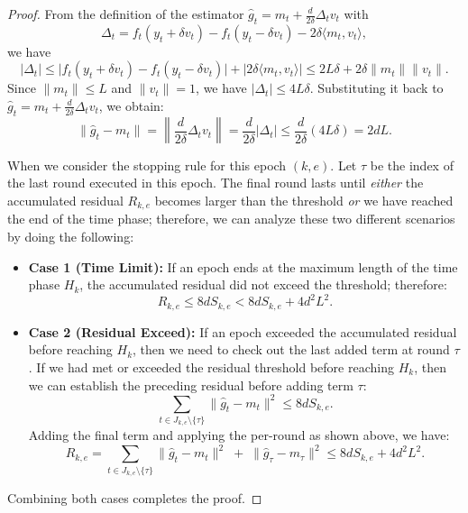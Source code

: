 \documentclass[journal,onecolumn]{IEEEtran}
\theoremstyle{plain}
\theoremstyle{definition}
\theoremstyle{remark}
\begin{document}
{\begin{proof}
    From the definition of the estimator $\hat g_{t} = m_{t} + \frac{d}{2\delta}\Delta
    _{t} v_{t}$ with
    \begin{equation*}
        \Delta_{t} = f_{t}(y_{t}+\delta v_{t}) - f_{t}(y_{t}-\delta v_{t}) - 2\delta
        \langle m_{t},v_{t}\rangle,
    \end{equation*}
    we have
    \begin{equation*}
        |\Delta_{t}|\le \big|f_{t}(y_{t}+\delta v_{t}) - f_{t}(y_{t}-\delta v_{t}
        )\big| + \big|2\delta\langle m_{t},v_{t}\rangle\big| \le 2L\delta + 2\delta
        \|m_{t}\|\|v_{t}\|.
    \end{equation*}
    Since $\|m_{t}\|\le L$ and $\|v_{t}\|=1$, we have $|\Delta_{t}| \le 4L\delta$.
    Substituting it back to $\hat g_{t} = m_{t} + \frac{d}{2\delta}\Delta
    _{t} v_{t}$, we obtain:
    \begin{equation*}
        \|\hat g_{t}-m_{t}\|= \left\| \frac{d}{2\delta}\Delta_{t} v_{t} \right\|
        =\frac{d}{2\delta}|\Delta_{t}| \le\frac{d}{2\delta}(4L\delta)=2dL.
    \end{equation*}

    When we consider the stopping rule for this epoch $(k,e)$. Let $\tau$ be the index of the last round executed in this epoch. The final round lasts until \emph{either} the accumulated residual $R_{k,e}$ becomes larger than the threshold \emph{or} we have reached the end of the time phase; therefore, we can analyze these two different scenarios by doing the following:
    \begin{itemize}
        \item \textbf{Case 1 (Time Limit):} If an epoch ends at the maximum length of the time phase $H_{k}$, the accumulated residual did not exceed the threshold; therefore:
        \begin{equation*}
            R_{k,e}\le 8d S_{k,e}< 8d S_{k,e}+ 4d^{2}L^{2}.
        \end{equation*}

        \item \textbf{Case 2 (Residual Exceed):} If an epoch exceeded the accumulated residual before reaching $H_{k}$, then we need to check out the last added term at round $\tau$. If we had met or exceeded the residual threshold before reaching $H_{k}$, then we can establish the preceding residual before adding term $\tau$: 
            \begin{equation*}
                \sum_{t \in J_{k,e} \setminus \{\tau\}}\|\hat g_{t} - m_{t}\|^{2}
                \le 8d S_{k,e}.
            \end{equation*}
            Adding the final term and applying the per-round as shown above, we have:
            \begin{equation*}
                R_{k,e}= \sum_{t \in J_{k,e} \setminus \{\tau\}}\|\hat g_{t} - m_{t}
                \|^{2} \;+\; \|\hat g_{\tau} - m_{\tau}\|^{2} \le 8d S_{k,e}+ 4d^{2}
                L^{2}.
            \end{equation*}
    \end{itemize}
    Combining both cases completes the proof.
\end{proof}

}
\end{document}

